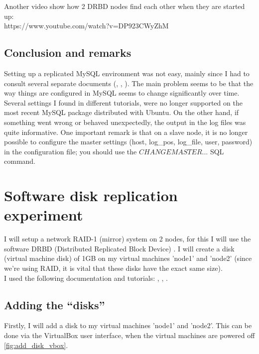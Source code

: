 \documentclass[12pt]{report}
\begin{document}
Another video show how 2 DRBD nodes find each other when they are
started up:\\
https://www.youtube.com/watch?v=DP923CWyZhM

\subsection{Conclusion and remarks}
Setting up a replicated MySQL environment was not easy, mainly since I
had to consult several separate documents (\cite{mysql_official_replication_doc}, \cite{mysql_replication_howtoforge}, \cite{mysql_replication_stackexchange}). The main problem seems to
be that the way things are configured in MySQL seems to change significantly
over time. Several settings I found in different tutorials, were no
longer supported on the most recent MySQL package distributed with
Ubuntu.
On the other hand, if something went wrong or behaved unexpectedly,
the output in the log files was quite informative. 
One important remark is that on a slave node, it is no longer possible
to configure the master settings (host, log\_pos, log\_file, user,
password) in the configuration file; you should use the $CHANGE
MASTER ...$ SQL command.

\section{Software disk replication experiment}
I will setup a network RAID-1 (mirror)
system on 2 nodes, for this I will use the software DRBD 
(Distributed Replicated Block Device) \cite{drbd_soft:2013}.
I will create a disk (virtual machine disk) of 1GB on my virtual
machines 'node1' and 'node2' (since we're using RAID, it is vital that
these disks have the exact same size).\\

I used the following documentation and tutorials:
\cite{drbd_ubuntu_doc}, \cite{drbd_official_doc}, \cite{drbd_howtoforge}.

\subsection{Adding the ``disks''}
Firstly, I will add a disk to my virtual machines 'node1' and
'node2'. This can be done via the VirtualBox user interface, when the
virtual machines are powered off \cref{fig:add_disk_vbox}.
\end{document}
